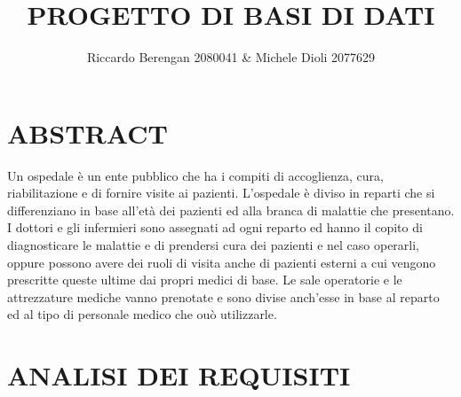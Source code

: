 \documentclass[a4paper, 10pt]{article}
\title{PROGETTO DI BASI DI DATI}
\author{Riccardo Berengan 2080041 \& Michele Dioli 2077629}
\begin{document}
\maketitle
\section{ABSTRACT}
Un ospedale è un ente pubblico che ha i compiti di accoglienza, cura, riabilitazione e di fornire visite ai pazienti. L'ospedale è diviso in reparti che si differenziano in base all'età dei pazienti ed alla branca di malattie che presentano. I dottori e gli infermieri sono assegnati ad ogni reparto ed hanno il copito di diagnosticare le malattie e di prendersi cura dei pazienti e nel caso operarli, oppure possono avere dei ruoli di visita anche di pazienti esterni a cui vengono prescritte queste ultime dai propri medici di base. Le sale operatorie e le attrezzature mediche vanno prenotate e sono divise anch'esse in base al reparto ed al tipo di personale medico che ouò utilizzarle.

\section{ANALISI DEI REQUISITI}
\end{document}

